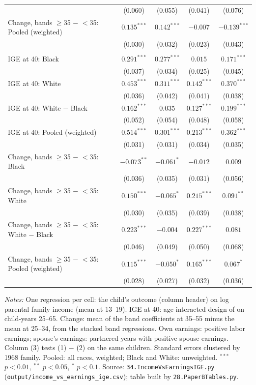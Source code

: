\begin{table}[!htbp]
{{\begin{tabular}{lcccc}
 & (0.060) & (0.055) & (0.041) & (0.076) \\
Change, bands $\geq$35 $-$ $<$35: Pooled (weighted) & $0.135^{***}$ & $0.142^{***}$ & $-0.007$ & $-0.139^{***}$ \\
 & (0.030) & (0.032) & (0.023) & (0.043) \\
\addlinespace
\multicolumn{5}{l}{\textit{Daughters}} \\
IGE at 40: Black & $0.291^{***}$ & $0.277^{***}$ & $0.015$ & $0.171^{***}$ \\
 & (0.037) & (0.034) & (0.025) & (0.045) \\
IGE at 40: White & $0.453^{***}$ & $0.311^{***}$ & $0.142^{***}$ & $0.370^{***}$ \\
 & (0.036) & (0.042) & (0.041) & (0.038) \\
IGE at 40: White $-$ Black & $0.162^{***}$ & $0.035$ & $0.127^{***}$ & $0.199^{***}$ \\
 & (0.052) & (0.054) & (0.048) & (0.058) \\
IGE at 40: Pooled (weighted) & $0.514^{***}$ & $0.301^{***}$ & $0.213^{***}$ & $0.362^{***}$ \\
 & (0.031) & (0.031) & (0.034) & (0.035) \\
Change, bands $\geq$35 $-$ $<$35: Black & $-0.073^{**}$ & $-0.061^{*}$ & $-0.012$ & $0.009$ \\
 & (0.036) & (0.035) & (0.031) & (0.056) \\
Change, bands $\geq$35 $-$ $<$35: White & $0.150^{***}$ & $-0.065^{*}$ & $0.215^{***}$ & $0.091^{**}$ \\
 & (0.030) & (0.035) & (0.039) & (0.038) \\
Change, bands $\geq$35 $-$ $<$35: White $-$ Black & $0.223^{***}$ & $-0.004$ & $0.227^{***}$ & $0.081$ \\
 & (0.046) & (0.049) & (0.050) & (0.068) \\
Change, bands $\geq$35 $-$ $<$35: Pooled (weighted) & $0.115^{***}$ & $-0.050^{*}$ & $0.165^{***}$ & $0.067^{*}$ \\
 & (0.028) & (0.027) & (0.032) & (0.036) \\
\bottomrule
\end{tabular}}}
\par\smallskip
\begin{minipage}{\textwidth}\footnotesize \textit{Notes:} One regression per cell: the child's outcome (column header) on log parental family income (mean at 13--19). IGE at 40: age-interacted design of \citet{lee2009trends} on child-years 25--65. Change: mean of the band coefficients at 35--55 minus the mean at 25--34, from the stacked band regressions. Own earnings: positive labor earnings; spouse's earnings: partnered years with positive spouse earnings. Column (3) tests (1) $-$ (2) on the same children. Standard errors clustered by 1968 family. Pooled: all races, weighted; Black and White: unweighted. $^{***}$ $p<0.01$, $^{**}$ $p<0.05$, $^{*}$ $p<0.1$. Source: \texttt{34.IncomeVsEarningsIGE.py} (\texttt{output/income\_vs\_earnings\_ige.csv}); table built by \texttt{28.PaperBTables.py}.\end{minipage}
\end{table}
